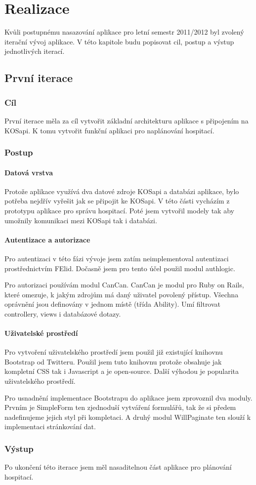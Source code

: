 \chapter{Realizace}
Kvůli postupnému nasazování aplikace pro letní semestr 2011/2012 byl zvolený iterační vývoj aplikace. V této kapitole budu popisovat cil, postup a výstup jednotlivých iterací.

\section{První iterace}
\subsection{Cíl}
První iterace měla za cíl vytvořit základní architekturu aplikace s připojením na KOSapi. K tomu vytvořit funkční aplikaci pro naplánování hospitací.

\subsection{Postup}
\subsubsection{Datová vrstva}
Protože aplikace využívá dva datové zdroje KOSapi a databázi aplikace, bylo potřeba nejdřív vyřešit jak se připojit ke KOSapi. V této části vycházím z prototypu aplikace pro správu hospitací. Poté jsem vytvořil modely tak aby umožnily komunikaci mezi KOSapi tak i databázi.

\subsubsection{Autentizace a autorizace}
Pro autentizaci v této fázi vývoje jsem zatím neimplementoval autentizaci prostřednictvím FElid. Dočasně jsem pro tento účel použil modul authlogic.

Pro autorizaci používám modul CanCan. CanCan je modul pro Ruby on Rails, které omezuje, k jakým zdrojům má daný uživatel povolený přístup. Všechna oprávnění jsou definovány v jednom místě (třída Ability). Umí filtrovat controllery, views i databázové dotazy.

\subsubsection{Uživatelské prostředí}
Pro vytvoření uživatelského prostředí jsem použil již existující knihovnu Bootstrap od Twitteru. Použil jsem tuto knihovnu protože obsahuje jak kompletní CSS tak i Javascript a je open-source. Další výhodou je popularita uživatelského prostředí.

Pro usnadnění implementace Bootstrapu do aplikace jsem zprovoznil dva moduly. Prvním je SimpleForm ten zjednoduší vytváření formulářů, tak že si předem nadefinujeme jejich styl při kompletaci. A druhý modul WillPaginate ten slouží k implementaci stránkování dat.

\subsection{Výstup} 
Po ukončení této iterace jsem měl nasaditelnou část aplikace pro plánování hospitací.
